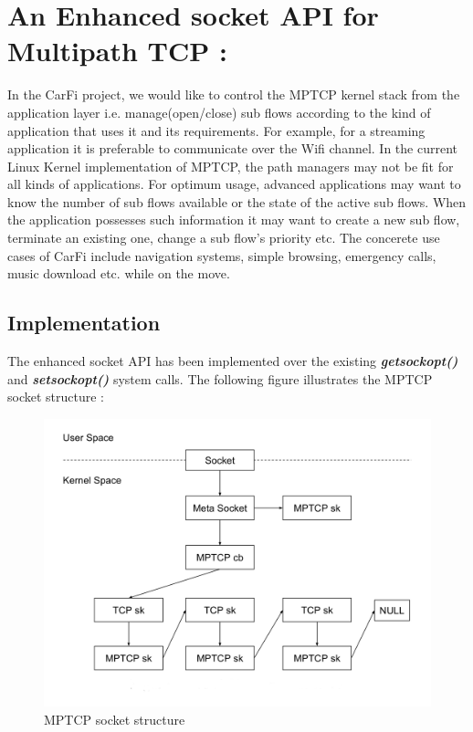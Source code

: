 \documentclass[a4paper,11pt]{article}
\begin{document}
	\section{An Enhanced socket API for Multipath TCP : }

		\label{sec:mptcpapi}
		 In the CarFi project, we would like to control the MPTCP kernel stack from the application layer i.e. manage(open/close) sub flows according to the kind of application that uses it and its requirements. For example, for a streaming application it is preferable to communicate over the Wifi channel. In the current Linux Kernel implementation of MPTCP, the path managers may not be fit for all kinds of applications. For optimum usage, advanced applications may want to know the number of sub flows available or the state of the active sub flows. When the application possesses such information it may want to create a new sub flow, terminate an existing one, change a sub flow's priority etc. The concerete use cases of CarFi include navigation systems, simple browsing, emergency calls, music download etc. while on the move.

		\subsection{Implementation}
			\label{subsec:implement}
			The enhanced socket API has been implemented over the existing \textbf{\emph{getsockopt()}} and \textbf{\emph{setsockopt()}} system calls. The following figure illustrates the MPTCP socket structure \cite{api}:
			\begin{figure}[h]
			\begin{center}
				\includegraphics[scale=1.5]{pictures/mptcp_socket_structure.jpg}
				\caption[]{MPTCP socket structure}
			\end{center}
			\end{figure}
\end{document}
